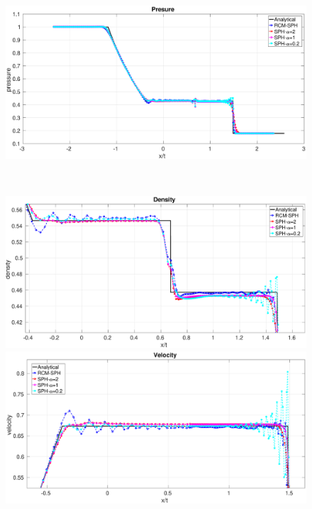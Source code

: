 \documentclass[review]{elsarticle}
\begin{document}
\begin{figure}[htp]
\begin{minipage}{.495\textwidth}
    \end{minipage}%
    \begin{minipage}{.495 \textwidth}
        \centering
        \includegraphics[width=0.99 \textwidth]{./Figures/Sod/RCM-Sod-SPH-alf-p}
    \end{minipage}%
    \\
    \begin{minipage}{.495\textwidth}
        \centering
        \includegraphics[width=0.99 \textwidth]{./Figures/Sod/RCM-Sod-SPH-alf-rho-zoom}
    \end{minipage}%
    \begin{minipage}{.495 \textwidth}
        \centering
        \includegraphics[width=0.99 \textwidth]{./Figures/Sod/RCM-Sod-SPH-alf-v-zoom}

\end{minipage}
\end{figure}
\end{document}
